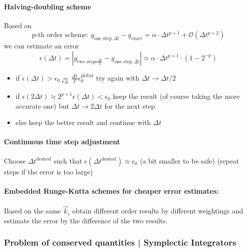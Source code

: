 \paragraph*{Halving-doubling scheme} Based on
\begin{equation}
    \text{p-th order scheme: } y_{\text{one step } \Delta t} - y_{\text{exact}} = \alpha \cdot \Delta t^{p+1} + \mathcal{O}(\Delta t^{p+2})
\end{equation}
we can estimate an error
\begin{equation}
    \epsilon(\Delta t) = \left| y_{\text{two steps} \frac{\Delta t}{2}} - y_{\text{one step } \Delta t} \right| \approx \alpha \cdot \Delta t^{p+1} \cdot \left( 1 - 2^{-p} \right)
\end{equation}
\begin{itemize}
    \item if $\epsilon(\Delta t) > \epsilon_0 \underset{\text{e.g.}}{=} \frac{\Delta t}{T} \epsilon_0^{\text{global}}$ try again with $\Delta t \rightarrow \Delta t \slash 2$
    \item if $\epsilon(2 \Delta t) \approx 2^{p+1} \epsilon(\Delta t) < \epsilon_0$ keep the result (of course taking the more accurate one) but $\Delta t \rightarrow 2 \Delta t$ for the next step
    \item else keep the better result and continue with $\Delta t$
\end{itemize}

\paragraph*{Continuous time step adjustment} Choose $\Delta t^{\text{desired}}$ such that $\epsilon(\Delta t^{\text{desired}}) \approx \epsilon_0$ (a bit smaller to be safe) (repeat steps if the error is too large)

\paragraph*{Embedded Runge-Kutta schemes for cheaper error estimates:} Based on the same $\vec{k}_i$ obtain different order results by different weightings and estimate the error by the difference of the two results.

\subsubsection*{Problem of conserved quantities | Symplectic Integrators}
